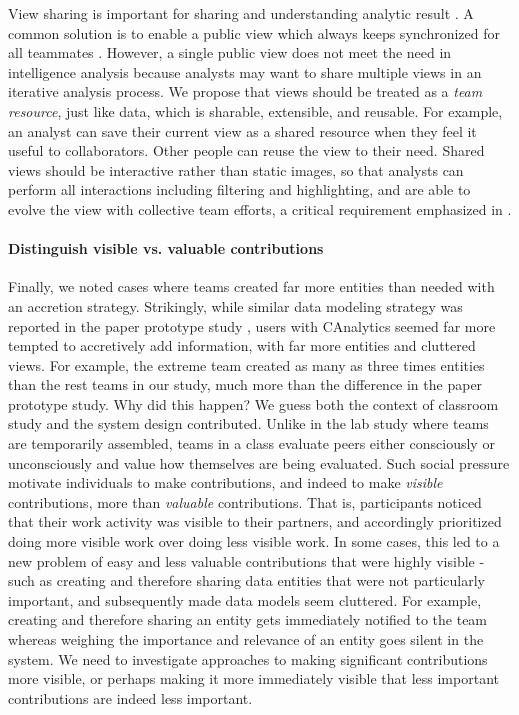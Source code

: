 View sharing is important for sharing and understanding analytic result
\cite{Morton2014a}. A common solution is to enable a public view which always
keeps synchronized for all teammates \cite{Convertino2011,Greenberg1990}.
However, a single public view does not meet the need in intelligence analysis
because analysts may want to share multiple views in an iterative analysis
process. We propose that views should be treated as a \emph{team resource}, just
like data, which is sharable, extensible, and reusable. For example, an analyst
can save their current view as a shared resource when they feel it useful to
collaborators. Other people can reuse the view to their need. Shared views
should be interactive rather than static images, so that analysts can perform
all interactions including filtering and highlighting, and are able to evolve
the view with collective team efforts, a critical requirement emphasized in
\cite{Carroll2013}.

\paragraph{Distinguish visible vs. valuable contributions}

Finally, we noted cases where teams created far more entities than needed with an
accretion strategy. Strikingly, while similar data modeling strategy was
reported in the paper prototype study \cite{Carroll2013}, users with CAnalytics
seemed far more tempted to accretively add information, with far more entities
and cluttered views. For example, the extreme team created as many as three
times entities than the rest teams in our study, much more than the difference
in the paper prototype study. Why did this happen? We guess both the context of
classroom study and the system design contributed. Unlike in the lab study where
teams are temporarily assembled, teams in a class evaluate peers either
consciously or unconsciously and value how themselves are being evaluated. Such
social pressure motivate individuals to make contributions, and indeed to make
\emph{visible} contributions, more than \emph{valuable} contributions. That is,
participants noticed that their work activity was visible to their partners, and
accordingly prioritized doing more visible work over doing less visible work. In
some cases, this led to a new problem of easy and less valuable contributions
that were highly visible - such as creating and therefore sharing data entities
that were not particularly important, and subsequently made data models seem
cluttered. For example, creating and therefore sharing an entity gets
immediately notified to the team whereas weighing the importance and relevance
of an entity goes silent in the system. We need to investigate approaches to
making significant contributions more visible, or perhaps making it more
immediately visible that less important contributions are indeed less important.
